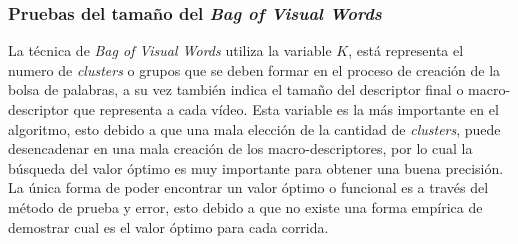 \subsubsection{Pruebas del tamaño del \textit{Bag of Visual Words}}
La técnica de \textit{Bag of Visual Words} utiliza la variable $K$, está representa el numero de \textit{clusters} o grupos que se deben formar en el proceso de creación de la bolsa de palabras, a su vez también indica el tamaño del descriptor final o macro-descriptor que representa a cada vídeo. Esta variable es la  más importante en el algoritmo, esto debido a que una mala elección de la cantidad de \textit{clusters}, puede desencadenar en una mala creación de los macro-descriptores, por lo cual la búsqueda del valor óptimo es muy importante para obtener una buena precisión. La única forma de poder encontrar un valor óptimo o funcional es a través del método de prueba y error, esto debido a que no existe una forma empírica de demostrar cual es el valor óptimo para cada corrida.

